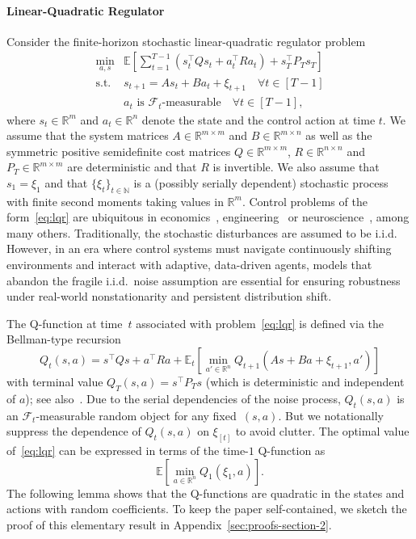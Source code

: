 \documentclass[11pt]{article}
\begin{document}
\paragraph{Linear-Quadratic Regulator}
Consider the finite-horizon stochastic linear-quadratic regulator problem
\begin{equation}
	\label{eq:lqr}
	\begin{array}{cl}
	\displaystyle \min_{a,s} & \displaystyle \mathbb E\left[\sum_{t=1}^{T-1} \left(s_t^\top Q s_t+a_t^\top Ra_t \right) +s_T^\top P_T s_T\right] \\
	\text{s.t.} & s_{t+1}= A s_t + B a_t + \xi_{t+1}\quad\forall  t\in[T-1] \\ & a_t \text{ is $\mathcal F_t$-measurable}\quad\forall  t\in[T-1],
	\end{array}
\end{equation}
where $s_t\in\mathbb{R}^m$ and $a_t\in\mathbb{R}^n$ denote the state and the control action at time $t$. We assume that the system matrices $A\in\mathbb{R}^{m\times m}$ and $B\in\mathbb{R}^{m\times n}$ as well as the symmetric positive semidefinite cost matrices $Q\in\mathbb R^{m\times m}$, $R\in\mathbb R^{n\times n}$ and $P_T\in\mathbb R^{m\times m}$ are deterministic and that $R$ is invertible. We also assume that~$s_1=\xi_1$ and that $\{\xi_t\}_{t\in \mathbb N}$ is a (possibly serially dependent) stochastic process with finite second moments taking values in $\mathbb{R}^m$. Control problems of the form~\eqref{eq:lqr} are ubiquitous in economics~\cite{hansen2008robustness}, engineering~\cite{bertsekas1995dynamic} or neuroscience~\cite{todorov2002optimal}, among many others. Traditionally, the stochastic disturbances are assumed to be i.i.d. However, in an era where control systems must navigate continuously shifting environments and interact with adaptive, data-driven agents, models that abandon the fragile i.i.d.\ noise assumption are essential for ensuring robustness under real-world nonstationarity and persistent distribution shift.


The Q-function at time~$t$ associated with problem~\eqref{eq:lqr} is defined via the Bellman-type recursion 
\begin{equation}
	\label{eq:Qdef}
	Q_t(s,a) = s^\top Q s + a^\top R a + \mathbb{E}_t \left[ \min_{a'\in\mathbb R^n} Q_{t+1}(As+Ba+\xi_{t+1},a') \right]
\end{equation}
with terminal value $Q_T(s,a)=s^\top P_T s$ (which is deterministic and independent of $a$); see also~\cite[\S~4.1]{bertsekas1995dynamic}. Due to the serial dependencies of the noise process, $Q_t(s,a)$ is an $\mathcal F_t$-measurable random object for any fixed~$(s,a)$. But we notationally suppress the dependence of $Q_t(s,a)$ on $\xi_{[t]}$ to avoid clutter. The optimal value of~\eqref{eq:lqr} can be expressed in terms of the time-$1$ Q-function as
\begin{equation}
	\label{eq:min-lqr}
	\mathbb E\left[ \min_{a\in\mathbb R^n} Q_1(\xi_1,a)\right].
\end{equation}
The following lemma shows that the Q-functions are quadratic in the states and actions with random coefficients. To keep the paper self-contained, we sketch the proof of this elementary result in Appendix~\ref{sec:proofs-section-2}.
\end{document}
